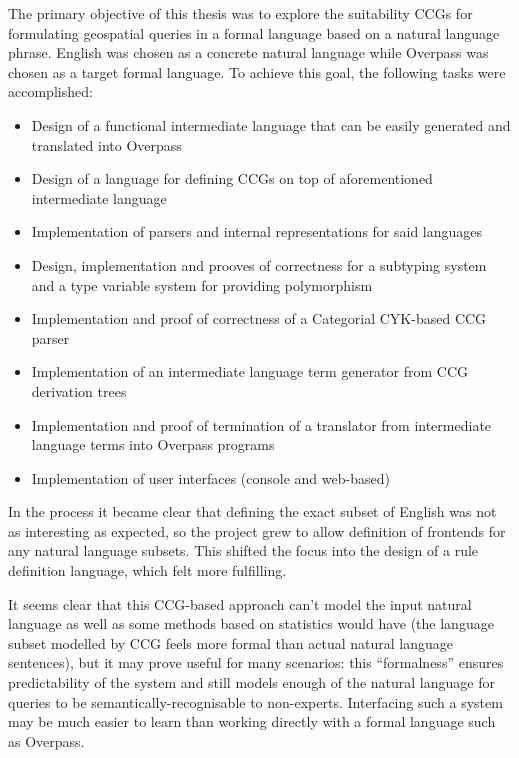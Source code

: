 \documentclass[main.tex]{subfiles}
\begin{document}
The primary objective of this thesis was to explore the suitability CCGs
for formulating geospatial queries in a formal language based on a
natural language phrase. English was chosen as a concrete natural language
while Overpass was chosen as a target formal language.
To achieve this goal, the following tasks were accomplished:

\begin{itemize}
    \item Design of a functional intermediate language that can be
        easily generated and translated into Overpass
    \item Design of a language for defining CCGs on top of aforementioned
        intermediate language
    \item Implementation of parsers and internal representations for said
        languages
    \item Design, implementation and prooves of correctness for
        a subtyping system and a type variable system for providing
        polymorphism
    \item Implementation and proof of correctness of a Categorial CYK-based
        CCG parser
    \item Implementation of an intermediate language term generator from
        CCG derivation trees
    \item Implementation and proof of termination of a translator from
        intermediate language terms into Overpass programs
    \item Implementation of user interfaces (console and web-based)
\end{itemize}

In the process it became clear that defining the exact subset of English
was not as interesting as expected, so the project grew to allow
definition of frontends for any natural language subsets. This shifted the
focus into the design of a rule definition language, which felt more
fulfilling.

It seems clear that this CCG-based approach can't model the input natural
language as well as some methods based on statistics would have
(the language subset modelled by CCG feels more formal than actual
natural language sentences), but it
may prove useful for many scenarios: this ``formalness'' ensures predictability
of the system and still models enough of the natural language for queries
to be semantically-recognisable to non-experts. Interfacing such a system
may be much easier to learn than working directly with a formal language
such as Overpass.
\end{document}
